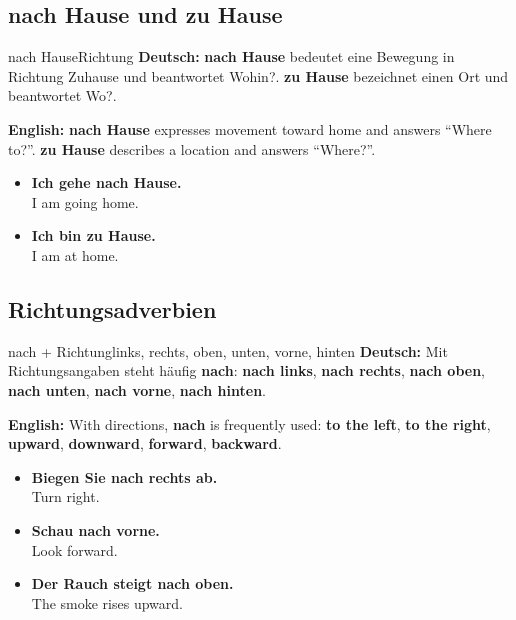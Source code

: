 \documentclass[a4paper,11pt]{article}
\newcommand{\GermanText}[1]{\textbf{Deutsch: }#1\par}
\newcommand{\EnglishText}[1]{{\small\color{SoftGray}\textbf{English: }#1\par}}
\newcommand{\ExampleItem}[2]{\item \textbf{#1}\\{\small\color{SoftGray}#2}}
\begin{document}
        \subsection{nach Hause und zu Hause}

        \begin{grammarentry}{nach Hause}{Richtung}
            \GermanText{\textbf{nach Hause} bedeutet eine Bewegung in Richtung Zuhause und beantwortet \glqq Wohin?\grqq. \textbf{zu Hause} bezeichnet einen Ort und beantwortet \glqq Wo?\grqq.}
            \EnglishText{\textbf{nach Hause} expresses movement toward home and answers ``Where to?''. \textbf{zu Hause} describes a location and answers ``Where?''.}
        \end{grammarentry}

        \begin{exbox}
            \begin{itemize}
                \ExampleItem{Ich gehe nach Hause.}{I am going home.}
                \ExampleItem{Ich bin zu Hause.}{I am at home.}
            \end{itemize}
        \end{exbox}

        \subsection{Richtungsadverbien}

        \begin{grammarentry}{nach + Richtung}{links, rechts, oben, unten, vorne, hinten}
            \GermanText{Mit Richtungsangaben steht häufig \textbf{nach}: \textbf{nach links}, \textbf{nach rechts}, \textbf{nach oben}, \textbf{nach unten}, \textbf{nach vorne}, \textbf{nach hinten}.}
            \EnglishText{With directions, \textbf{nach} is frequently used: \textbf{to the left}, \textbf{to the right}, \textbf{upward}, \textbf{downward}, \textbf{forward}, \textbf{backward}.}
        \end{grammarentry}

        \begin{exbox}
            \begin{itemize}
                \ExampleItem{Biegen Sie nach rechts ab.}{Turn right.}
                \ExampleItem{Schau nach vorne.}{Look forward.}
                \ExampleItem{Der Rauch steigt nach oben.}{The smoke rises upward.}
            \end{itemize}
        \end{exbox}
\end{document}
